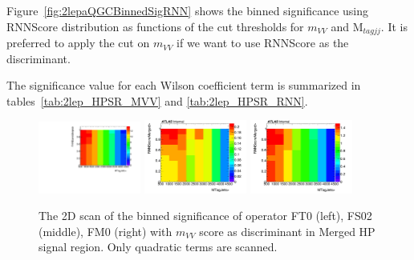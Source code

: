 Figure~\ref{fig:2lepaQGCBinnedSigRNN} shows the binned significance using RNNScore distribution
as functions of the cut thresholds for $m_{VV}$ and $\mathrm{M}_{tagjj}$.
It is preferred to apply the cut on $m_{VV}$ if we want to use RNNScore as the discriminant.

The significance value for each Wilson coefficient term is summarized in tables~\ref{tab:2lep_HPSR_MVV} and \ref{tab:2lep_HPSR_RNN}.

\begin{figure}[ht]
    \centering
    	\includegraphics[width=0.30\textwidth]{figures/aQGC/HPSRFT0MVV.pdf}
    	\includegraphics[width=0.30\textwidth]{figures/aQGC/HPSRFS02MVV.pdf}
    	\includegraphics[width=0.30\textwidth]{figures/aQGC/HPSRFM0MVV.pdf}
        \caption{The 2D scan of the binned significance of operator FT0 (left), FS02 (middle), FM0 (right) with $m_{VV}$ score as discriminant in Merged HP signal region. Only quadratic terms are scanned.}
        \label{fig:2lepaQGCBinnedSigMVV}
\end{figure}

